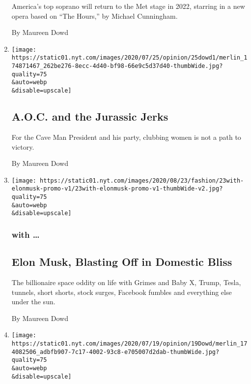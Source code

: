 \begin{enumerate}
  America's top soprano will return to the Met stage in 2022, starring
  in a new opera based on ``The Hours,'' by Michael Cunningham.

  By Maureen Dowd
\item
  \href{/2020/07/25/opinion/sunday/aoc-yoho-trump-2020.html}{}

  \texttt{[image: https://static01.nyt.com/images/2020/07/25/opinion/25dowd1/merlin\_174871467\_262be276-8ecc-4d40-bf98-66e9c5d37d40-thumbWide.jpg?quality=75\\\&auto=webp\\\&disable=upscale]}

  \hypertarget{aoc-and-the-jurassic-jerks}{%
  \subsection{A.O.C. and the Jurassic
  Jerks}\label{aoc-and-the-jurassic-jerks}}

  For the Cave Man President and his party, clubbing women is not a path
  to victory.

  By Maureen Dowd
\item
  \href{/2020/07/25/style/elon-musk-maureen-dowd.html}{}

  \texttt{[image: https://static01.nyt.com/images/2020/08/23/fashion/23with-elonmusk-promo-v1/23with-elonmusk-promo-v1-thumbWide-v2.jpg?quality=75\\\&auto=webp\\\&disable=upscale]}

  \hypertarget{with--1}{%
  \subsubsection{with \ldots{}}\label{with--1}}

  \hypertarget{elon-musk-blasting-off-in-domestic-bliss}{%
  \subsection{Elon Musk, Blasting Off in Domestic
  Bliss}\label{elon-musk-blasting-off-in-domestic-bliss}}

  The billionaire space oddity on life with Grimes and Baby X, Trump,
  Tesla, tunnels, short shorts, stock surges, Facebook fumbles and
  everything else under the sun.

  By Maureen Dowd
\item
  \href{/2020/07/18/opinion/sunday/fauci-trump-coronavirus.html}{}

  \texttt{[image: https://static01.nyt.com/images/2020/07/19/opinion/19Dowd/merlin\_174082506\_adbfb907-7c17-4002-93c8-e705007d2dab-thumbWide.jpg?quality=75\\\&auto=webp\\\&disable=upscale]}


\end{enumerate}
